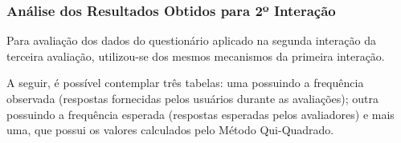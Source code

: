 			\subsubsection[Análise dos Resultados Obtidos para 2º Interação]{Análise dos Resultados Obtidos para 2º Interação}
			\label{sec:terceiraAvaliacao_2_Analise}

				Para avaliação dos dados do questionário aplicado na segunda interação da terceira avaliação, utilizou-se dos mesmos mecanismos da primeira interação.
				
				A seguir, é possível contemplar três tabelas: uma possuindo a frequência observada (respostas fornecidas pelos usuários durante as avaliações); outra possuindo a frequência esperada (respostas esperadas pelos avaliadores) e mais uma, que possui os valores calculados pelo Método Qui-Quadrado.


